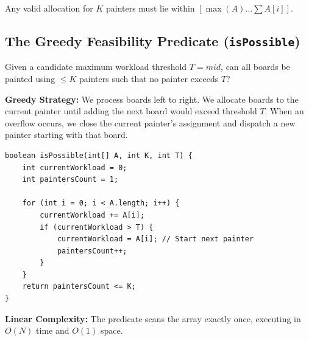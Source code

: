 \documentclass[10pt,journal,compsoc,onecolumn]{IEEEtran}
\begin{document}
Any valid allocation for $K$ painters must lie within $[\max(A) \dots \sum A[i]]$.

\subsection{The Greedy Feasibility Predicate (\texttt{isPossible})}

Given a candidate maximum workload threshold $T = mid$, can all boards be painted using $\le K$ painters such that no painter exceeds $T$?

\textbf{Greedy Strategy:} We process boards left to right. We allocate boards to the current painter until adding the next board would exceed threshold $T$. When an overflow occurs, we close the current painter's assignment and dispatch a new painter starting with that board.

{\small
\begin{verbatim}
boolean isPossible(int[] A, int K, int T) {
    int currentWorkload = 0;
    int paintersCount = 1;

    for (int i = 0; i < A.length; i++) {
        currentWorkload += A[i];
        if (currentWorkload > T) {
            currentWorkload = A[i]; // Start next painter
            paintersCount++;
        }
    }
    return paintersCount <= K;
}
\end{verbatim}
}

\textbf{Linear Complexity:} The predicate scans the array exactly once, executing in $O(N)$ time and $O(1)$ space.
\end{document}
